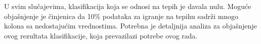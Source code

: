 \documentclass[a4paper]{article}
\begin{document}

U svim slučajevima, klasifikacija koja se odnosi na tepih je davala nulu. Moguće objašnjenje je činjenica da 10\% podataka
za igranje na tepihu sadrži mnogo kolona sa nedostajućim vrednostima. Potrebna je detaljnija analiza za objašnjenje ovog rezultata klasifikacije,
koja prevazilazi potrebe ovog rada.

	



%
\end{document}
